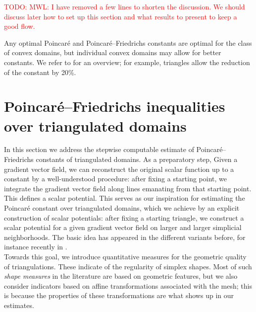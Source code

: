 \documentclass[12pt,a4paper]{article}
\newcommand{\todo}[1]{\textcolor{red}{TODO: #1}}
\begin{document}
\todo{MWL: I have removed a few lines to shorten the discussion. We should discuss later how to set up this section and what results to present to keep a good flow.}

\begin{remark}
    Any optimal Poincar\'e and Poincar\'e--Friedrichs constants are optimal for the class of convex domains, 
    but individual convex domains may allow for better constants.
    We refer to \cite{matculevich2016explicit} for an overview;
    for example, triangles allow the reduction of the constant by 20\%.
\end{remark}









\section{Poincar\'e--Friedrichs inequalities over triangulated domains}\label{section:gradient}

In this section we address the stepwise computable estimate of Poincar\'e--Friedrichs constants of triangulated domains. As a preparatory step, 
Given a gradient vector field, we can reconstruct the original scalar function up to a constant by a well-understood procedure: after fixing a starting point, we integrate the gradient vector field along lines emanating from that starting point. This defines a scalar potential. 
This serves as our inspiration for estimating the Poincar\'e constant over triangulated domains, which we achieve by an explicit construction of scalar potentials: 
after fixing a starting triangle, we construct a scalar potential for a given gradient vector field on larger and larger simplicial neighborhoods. 
The basic idea has appeared in the different variants before, for instance recently in \cite{Ern_Voh_p_rob_3D_20, Chaum_Voh_p_rob_3D_H_curl_23, Voh_loc_glob_H1_24}.
\\


Towards this goal, we introduce quantitative measures for the geometric quality of triangulations. 
These indicate of the regularity of simplex shapes. 
Most of such \emph{shape measures} in the literature are based on geometric features, 
but we also consider indicators based on affine transformations associated with the mesh;
this is because the properties of these transformations are what shows up in our estimates. 
\end{document}
